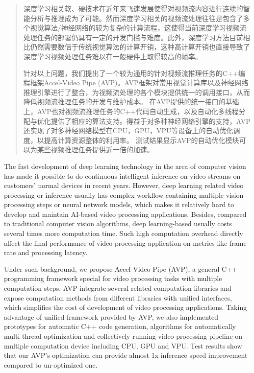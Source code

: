 
\begin{abstract}
深度学习相关软、硬技术在近年来飞速发展使得对视频流内容进行连续的智能分析与推理成为了可能。然而深度学习相关的视频流处理往往是包含了多个视觉算法/神经网络的较为复杂的计算流程，这使得当前深度学习视频流处理任务的部署仍具有一定的开发门槛与难度。此外，深度学习方法目前相比仍然需要数倍于传统视觉算法的计算开销，这种高计算开销也直接导致了深度学习视频处理任务难以在一般硬件上取得较高的帧率。\par
针对以上问题，我们提出了一个较为通用的针对视频流推理任务的C++编程框架Accel-Video Pipe (AVP)。AVP框架对常用视觉计算库以及神经网络推理引擎进行了整合，为视频流处理的各个模块提供统一的调用接口，从而降低视频流推理任务的开发与维护成本。
在AVP提供的统一接口的基础上，AVP也对视频流推理任务的C++代码自动生成，以及自动化多线程分配与优化提供了相应的算法支持。得益于对多种神经网络引擎的支持，AVP还实现了对多神经网络模型在CPU，GPU，VPU等设备上的自动优化调度，以提高计算资源整体的利用率。%
测试结果显示AVP的自动优化模块可以为某些视频推理任务提供近一倍的加速。
\end{abstract}

\begin{enabstract}
The fast development of deep learning technology in the area of computer vision has made it possible to do continuous intelligent inference on video streams on customers' normal devices in recent years. 
However, deep learning related video processing or inference usually has complex workflow containing multiple vision processing steps or neural network models, which makes it relatively hard to develop and maintain AI-based video processing applications. Besides, compared to traditional computer vision algorithms, deep learning-based usually costs several times more computation time. Such high computation overhead directly affect the final performance of video processing application on metrics like frame rate and processing latency.\par
Under such background, we propose Accel-Video Pipe (AVP), a general C++ programming framework special for video processing tasks with multiple computation steps. AVP integrate several related computation libraries and expose computation methods from different libraries with unified interfaces, which simplifies the cost of development of video processing applications. Taking advantage of unified framework provided by AVP, we also implemented prototypes for automatic C++ code generation, algorithms for automatically multi-thread optimization and collectively running video processing pipeline on multiple computation device including CPU, GPU and VPU. 
Test results show that our AVP's optimization can provide almost 1x inference speed improvement compared to un-optimized one.
\end{enabstract}
